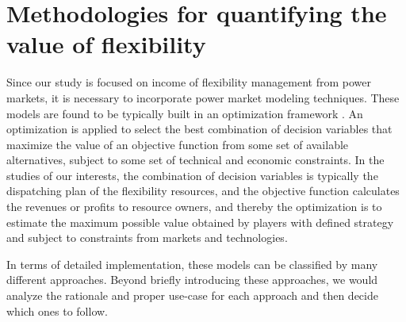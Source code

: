 






\section{Methodologies for quantifying the value of flexibility}
Since our study is focused on income of flexibility management from power markets, it is necessary to incorporate power market modeling techniques. These models are found to be typically built in an optimization framework \cite{Zucker2013,GRUNEWALD2012449,VENTOSA2005897}. An optimization is applied to select the best combination of decision variables that maximize the value of an objective function from some set of available alternatives, subject to some set of technical and economic constraints. In the studies of our interests, the combination of decision variables is typically the dispatching plan of the flexibility resources, and the objective function calculates the revenues or profits to resource owners, and thereby the optimization is to estimate the maximum possible value obtained by players with defined strategy and subject to constraints from markets and technologies. 

In terms of detailed implementation, these models can be classified by many different approaches. Beyond briefly introducing these approaches, we would analyze the rationale and proper use-case for each approach and then decide which ones to follow.

